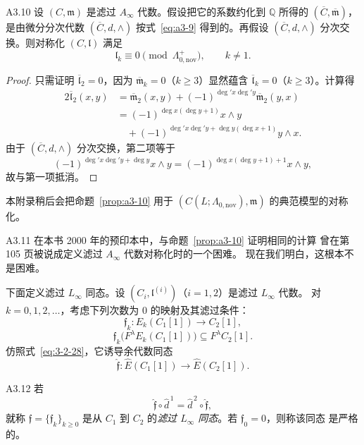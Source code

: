 \begin{proposition}{A3.10}\label{prop:a3-10}
设 $(C,\mathfrak m)$ 是滤过 $A_\infty$ 代数。假设把它的系数约化到
$\mathbb Q$ 所得的
$(\overline C,\overline{\mathfrak m})$，是由微分分次代数
$(\overline C,d,\wedge)$ 按式~\eqref{eq:a3-9} 得到的。再假设
$(\overline C,d,\wedge)$ 分次交换。则对称化
$(C,\mathfrak l)$ 满足
\[
 \mathfrak l_k\equiv0\pmod{\Lambda^+_{0,\mathrm{nov}}},
 \qquad k\ne1.
\]
\end{proposition}

\begin{proof}
只需证明 $\overline{\mathfrak l}_2=0$，因为
$\overline{\mathfrak m}_k=0$（$k\geq3$）显然蕴含
$\overline{\mathfrak l}_k=0$（$k\geq3$）。计算得
\[
\begin{aligned}
 2\overline{\mathfrak l}_2(x,y)
 &=
 \overline{\mathfrak m}_2(x,y)
 +(-1)^{\deg' x\deg' y}\overline{\mathfrak m}_2(y,x)\\
 &=
 (-1)^{\deg x(\deg y+1)}x\wedge y\\
 &\quad{}
 +(-1)^{\deg' x\deg' y+\deg y(\deg x+1)}y\wedge x.
\end{aligned}
\]
由于 $(\overline C,d,\wedge)$ 分次交换，第二项等于
\[
 (-1)^{\deg' x\deg' y+\deg y}x\wedge y
 =(-1)^{\deg x(\deg y+1)+1}x\wedge y,
\]
故与第一项抵消。
\end{proof}

本附录稍后会把命题~\ref{prop:a3-10} 用于
$(C(L;\Lambda_{0,\mathrm{nov}}),\mathfrak m)$ 的典范模型的对称化。

\begin{remark}{A3.11}\label{rem:a3-11}
在本书 2000 年的预印本中，与命题~\ref{prop:a3-10} 证明相同的计算
曾在第 105 页被说成定义滤过 $A_\infty$ 代数对称化时的一个困难。
现在我们明白，这根本不是困难。
\end{remark}

下面定义滤过 $L_\infty$ 同态。设
$(C_i,\mathfrak l^{(i)})$（$i=1,2$）是滤过 $L_\infty$ 代数。
对 $k=0,1,2,\ldots$，考虑下列次数为 $0$ 的映射及其滤过条件：
\[
 \mathfrak f_k\colon E_k(C_1[1])\longrightarrow C_2[1],
\]
\[
 \mathfrak f_k\bigl(F^\lambda E_k(C_1[1])\bigr)
 \subseteq F^\lambda C_2[1].
\]
仿照式~\eqref{eq:3-2-28}，它诱导余代数同态
\[
 \widehat{\mathfrak f}\colon
 \widehat E(C_1[1])\longrightarrow\widehat E(C_2[1]).
\]

\begin{definition}{A3.12}\label{def:a3-12}
%
若
\[
 \widehat{\mathfrak f}\circ\widehat d^{\,1}
 =\widehat d^{\,2}\circ\widehat{\mathfrak f},
\]
就称 $\mathfrak f=\{\mathfrak f_k\}_{k\geq0}$ 是从 $C_1$ 到 $C_2$
的\emph{滤过 $L_\infty$ 同态}。若 $\mathfrak f_0=0$，则称该同态
是严格的。
\end{definition}

